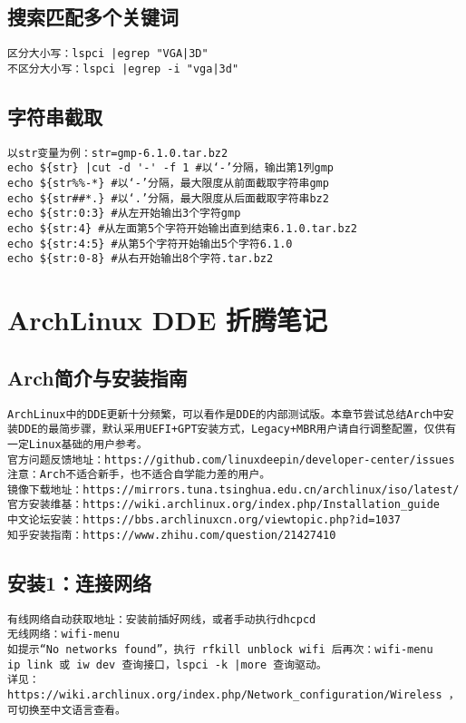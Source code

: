 \documentclass[a4paper,fontset=fandol,zihao=-4,linespread=1.2]{ctexbook}
\begin{document}
\section{搜索匹配多个关键词}
\begin{lstlisting}
区分大小写：lspci |egrep "VGA|3D"
不区分大小写：lspci |egrep -i "vga|3d"
\end{lstlisting}

\section{字符串截取}
\begin{lstlisting}
以str变量为例：str=gmp-6.1.0.tar.bz2
echo ${str} |cut -d '-' -f 1 #以‘-’分隔，输出第1列gmp
echo ${str%%-*} #以‘-’分隔，最大限度从前面截取字符串gmp
echo ${str##*.} #以‘.’分隔，最大限度从后面截取字符串bz2
echo ${str:0:3} #从左开始输出3个字符gmp
echo ${str:4} #从左面第5个字符开始输出直到结束6.1.0.tar.bz2
echo ${str:4:5} #从第5个字符开始输出5个字符6.1.0
echo ${str:0-8} #从右开始输出8个字符.tar.bz2
\end{lstlisting}


\chapter{ArchLinux DDE 折腾笔记}

\section{Arch简介与安装指南}
\begin{lstlisting}
ArchLinux中的DDE更新十分频繁，可以看作是DDE的内部测试版。本章节尝试总结Arch中安装DDE的最简步骤，默认采用UEFI+GPT安装方式，Legacy+MBR用户请自行调整配置，仅供有一定Linux基础的用户参考。
官方问题反馈地址：https://github.com/linuxdeepin/developer-center/issues
注意：Arch不适合新手，也不适合自学能力差的用户。
镜像下载地址：https://mirrors.tuna.tsinghua.edu.cn/archlinux/iso/latest/
官方安装维基：https://wiki.archlinux.org/index.php/Installation_guide
中文论坛安装：https://bbs.archlinuxcn.org/viewtopic.php?id=1037
知乎安装指南：https://www.zhihu.com/question/21427410
\end{lstlisting}

\section{安装1：连接网络}
\begin{lstlisting}
有线网络自动获取地址：安装前插好网线，或者手动执行dhcpcd
无线网络：wifi-menu
如提示“No networks found”，执行 rfkill unblock wifi 后再次：wifi-menu
ip link 或 iw dev 查询接口，lspci -k |more 查询驱动。
详见：https://wiki.archlinux.org/index.php/Network_configuration/Wireless ，可切换至中文语言查看。
\end{lstlisting}
\end{document}
